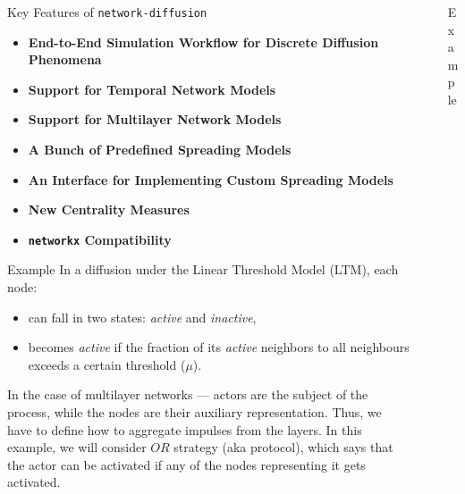 \documentclass[final]{beamer}
\newlength{\sepwidth}
\newlength{\colwidth}
\newcommand{\separatorcolumn}{\begin{column}{\sepwidth}\end{column}}
\begin{document}
\begin{frame}[t, fragile]
\begin{columns}[t]
\begin{column}{\colwidth}
\begin{block}{Key Features of \lstinline[style=py, basicstyle=\large\ttfamily]{network-diffusion}}
    \begin{itemize}
        \item \textbf{End-to-End Simulation Workflow for Discrete Diffusion Phenomena}
        \item \textbf{Support for Temporal Network Models}
        \item \textbf{Support for Multilayer Network Models}
        \item \textbf{A Bunch of Predefined Spreading Models}
        \item \textbf{An Interface for Implementing Custom Spreading Models}
        \item \textbf{New Centrality Measures}
        \item \textbf{\lstinline[style=py, basicstyle=\large\ttfamily]{networkx} Compatibility}
    \end{itemize}
\end{block}

\begin{exampleblock}{Example}
    In a diffusion under the Linear Threshold Model (LTM), each node:
    \begin{itemize}
        \item can fall in two states: \textit{active} and \textit{inactive},
        \item becomes \textit{active} if the fraction of its \textit{active} neighbors to all 
        neighbours exceeds a certain threshold ($\mu$).
    \end{itemize}
    In the case of multilayer networks --- actors are the subject of the process, while the 
    nodes are their auxiliary representation. Thus, we have to define how to aggregate impulses 
    from the layers. In this example, we will consider $OR$ strategy (aka protocol), which says that
    the actor can be activated if any of the nodes representing it gets activated.
\end{exampleblock}

\end{column}

\separatorcolumn
\begin{column}{\colwidth}

\begin{exampleblock}{Example}


\end{exampleblock}
\end{column}
\end{columns}
\end{frame}
\end{document}
